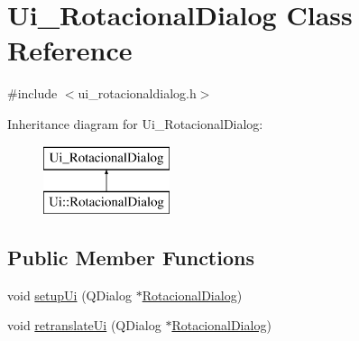 \hypertarget{class_ui___rotacional_dialog}{\section{Ui\-\_\-\-Rotacional\-Dialog Class Reference}
\label{class_ui___rotacional_dialog}
}


{\ttfamily \#include $<$ui\-\_\-rotacionaldialog.\-h$>$}

Inheritance diagram for Ui\-\_\-\-Rotacional\-Dialog\-:\begin{figure}[H]
\begin{center}
\leavevmode
\includegraphics[height=2.000000cm]{class_ui___rotacional_dialog}
\end{center}
\end{figure}
\subsection*{Public Member Functions}
\begin{DoxyCompactItemize}
\item 
void \hyperlink{class_ui___rotacional_dialog_a8dbbda795fa35333f33609a41d5471cf}{setup\-Ui} (Q\-Dialog $\ast$\hyperlink{class_rotacional_dialog}{Rotacional\-Dialog})
\item 
void \hyperlink{class_ui___rotacional_dialog_a6c5858dae29f07195f087e59f6346e9e}{retranslate\-Ui} (Q\-Dialog $\ast$\hyperlink{class_rotacional_dialog}{Rotacional\-Dialog})
\end{DoxyCompactItemize}
